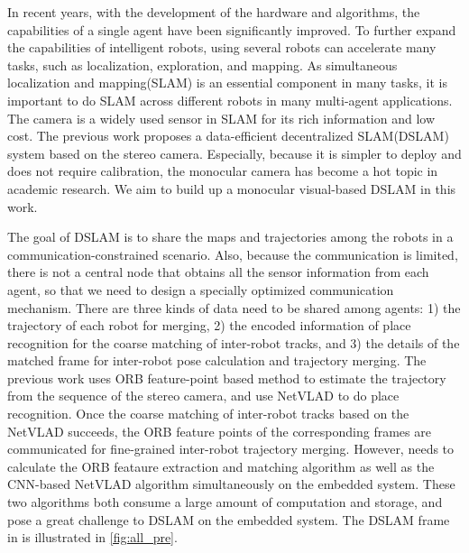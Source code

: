 \label{sec:introdutction}
In recent years, with the development of the hardware and algorithms, the capabilities of a single agent have been significantly improved.
To further expand the capabilities of intelligent robots, using several robots can accelerate many tasks, such as localization, exploration, and mapping.
As simultaneous localization and mapping(SLAM) is an essential component in many tasks, it is important to do SLAM across different robots in many multi-agent applications.
The camera is a widely used sensor in SLAM for its rich information and low cost. The previous work \cite{Cieslewski:20187ee} proposes a data-efficient decentralized SLAM(DSLAM) system based on the stereo camera.
Especially, because it is simpler to deploy and does not require calibration, the monocular camera has become a hot topic in academic research. We aim to build up a monocular visual-based DSLAM in this work.

The goal of DSLAM is to share the maps and trajectories among the robots in a communication-constrained scenario. Also, because the communication is limited, there is not a central node that obtains all the sensor information from each agent, so that we need to design a specially optimized communication mechanism. There are three kinds of data need to be shared among agents: 1) the trajectory of each robot for merging, 2) the encoded information of place recognition for the coarse matching of inter-robot tracks, and 3) the details of the matched frame for inter-robot pose calculation and trajectory merging. The previous work \cite{Cieslewski:20187ee} uses ORB feature-point based method to estimate the trajectory from the sequence of the stereo camera, and use NetVLAD \cite{Arandjelovic:2017997} to do place recognition. Once the coarse matching of inter-robot tracks based on the NetVLAD succeeds, the ORB feature points of the corresponding frames are communicated for fine-grained inter-robot trajectory merging. However, \cite{Cieslewski:20187ee} needs to calculate the ORB feataure extraction and matching algorithm as well as the CNN-based NetVLAD algorithm simultaneously on the embedded system. These two algorithms both consume a large amount of computation and storage, and pose a great challenge to DSLAM on the embedded system. The DSLAM frame in \cite{Cieslewski:20187ee} is illustrated in \cref{fig:all_pre}.

